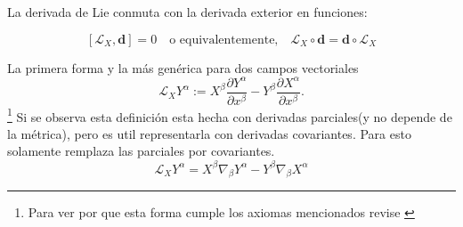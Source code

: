 \begin{axiom}\label{ax:Lie4}
    La derivada de Lie conmuta con la derivada exterior en funciones:


    \begin{equation}
        \left[\mathcal{L}_X, \mathbf{d} \right] = 0 \quad \text{o equivalentemente,} \quad \mathcal{L}_X \circ \mathbf{d} = \mathbf{d} \circ \mathcal{L}_X
    \end{equation}

\end{axiom}
\noindent La primera forma y la más genérica para dos campos vectoriales
\begin{equation}
    \mathscr{L}_X Y^\alpha := X^\beta \frac{\partial Y^\alpha}{\partial x^\beta}-Y^\beta \frac{\partial X^\alpha}{\partial x^\beta}.
\end{equation}
\footnote{Para ver por que esta forma cumple los axiomas mencionados revise \cite{Lie}}
Si se observa esta definición esta hecha con derivadas parciales(y no depende de la métrica), pero es util representarla con derivadas covariantes. Para esto solamente  remplaza las parciales por covariantes.
\begin{equation}
    \mathscr{L}_X Y^\alpha = X^\beta \nabla_\beta Y^\alpha  - Y^\beta \nabla_\beta X^\alpha
\end{equation}
